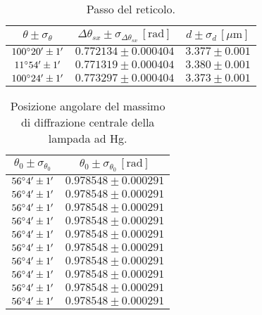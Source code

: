 \documentclass[]{article}
\begin{document}
    \begin{table}[H]
        \centering
        \begin{tabular}{||c|c|c||}
            \hline
            $\theta \pm \sigma_{\theta}$ & $\Delta\theta_{sx} \pm \sigma_{\Delta\theta_{sx}} \, \left[\text{rad}\right]$ & $d \pm \sigma_d \,\left[\mu\text{m}\right]$ \\\hline
            \hline
            $100\degree 20' \pm 1'$ & $0.772134 \pm 0.000404$ & $3.377 \pm 0.001$ \\\hline
            $ 11\degree 54' \pm 1'$ & $0.771319 \pm 0.000404$ & $3.380 \pm 0.001$ \\\hline
            $100\degree 24' \pm 1'$ & $0.773297 \pm 0.000404$ & $3.373 \pm 0.001$ \\\hline
        \end{tabular}
        \caption{Passo del reticolo.}
        \label{d-Na}
    \end{table}

    \begin{table}[H]
        \centering
        \begin{tabular}{||c|c||}
            \hline
            $\theta_0 \pm \sigma_{\theta_0}$ & $\theta_0 \pm \sigma_{\theta_0} \, \left[\text{rad}\right]$ \\\hline
            \hline
            $56\degree 4' \pm 1'$ & $0.978548 \pm 0.000291$ \\\hline
            $56\degree 4' \pm 1'$ & $0.978548 \pm 0.000291$ \\\hline
            $56\degree 4' \pm 1'$ & $0.978548 \pm 0.000291$ \\\hline
            $56\degree 4' \pm 1'$ & $0.978548 \pm 0.000291$ \\\hline
            $56\degree 4' \pm 1'$ & $0.978548 \pm 0.000291$ \\\hline
            $56\degree 4' \pm 1'$ & $0.978548 \pm 0.000291$ \\\hline
            $56\degree 4' \pm 1'$ & $0.978548 \pm 0.000291$ \\\hline
            $56\degree 4' \pm 1'$ & $0.978548 \pm 0.000291$ \\\hline
            $56\degree 4' \pm 1'$ & $0.978548 \pm 0.000291$ \\\hline
            $56\degree 4' \pm 1'$ & $0.978548 \pm 0.000291$ \\\hline
        \end{tabular}
        \caption{Posizione angolare del massimo di diffrazione centrale della lampada ad Hg.}
        \label{max-Hg}
    \end{table}
\end{document}
